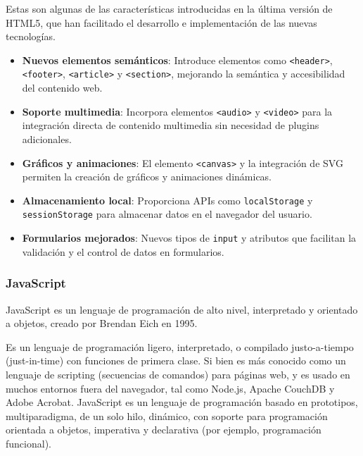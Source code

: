 \documentclass[a4paper, 12pt]{book}
\begin{document}
        Estas son algunas de las características introducidas en la última versión de HTML5, que han facilitado el desarrollo e implementación de las nuevas tecnologías.

        \begin{itemize}
            \item \textbf{Nuevos elementos semánticos}: Introduce elementos como \texttt{<header>}, \texttt{<footer>}, \texttt{<article>} y \texttt{<section>}, mejorando la semántica y accesibilidad del contenido web.
            \item \textbf{Soporte multimedia}: Incorpora elementos \texttt{<audio>} y \texttt{<video>} para la integración directa de contenido multimedia sin necesidad de plugins adicionales.
            \item \textbf{Gráficos y animaciones}: El elemento \texttt{<canvas>} y la integración de SVG permiten la creación de gráficos y animaciones dinámicas.
            \item \textbf{Almacenamiento local}: Proporciona APIs como \texttt{localStorage} y \texttt{sessionStorage} para almacenar datos en el navegador del usuario.
            \item \textbf{Formularios mejorados}: Nuevos tipos de \texttt{input} y atributos que facilitan la validación y el control de datos en formularios.
        \end{itemize}
        
        
        \subsubsection{JavaScript}
        JavaScript\cite{JavaScriptMDN,ECMAScript,JavaScriptWikibooks} es un lenguaje de programación de alto nivel, interpretado y orientado a objetos, creado por Brendan Eich en 1995.

        Es un lenguaje de programación ligero, interpretado, o compilado justo-a-tiempo (just-in-time) con funciones de primera clase. Si bien es más conocido como un lenguaje de scripting (secuencias de comandos) para páginas web, y es usado en muchos entornos fuera del navegador, tal como Node.js, Apache CouchDB y Adobe Acrobat. JavaScript es un lenguaje de programación basado en prototipos, multiparadigma, de un solo hilo, dinámico, con soporte para programación orientada a objetos, imperativa y declarativa (por ejemplo, programación funcional).
\end{document}
